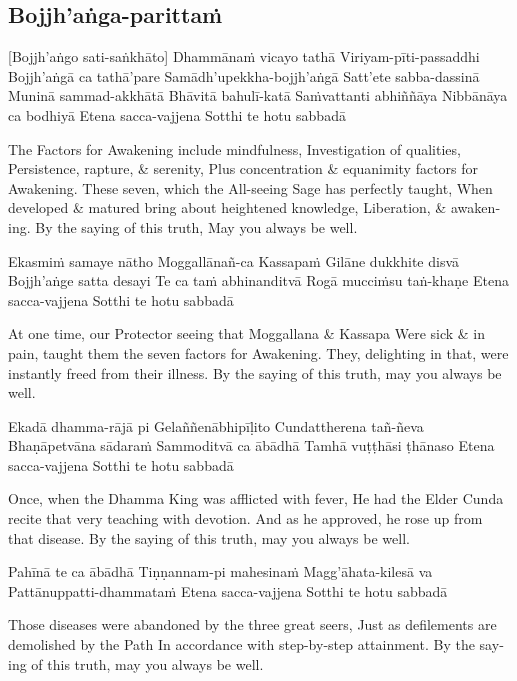 \subsection{Bojjh’aṅga-parittaṁ}
[Bojjh’aṅgo sati-saṅkhāto]
Dhammānaṁ vicayo tathā
Viriyam-pīti-passaddhi
Bojjh’aṅgā ca tathā’pare
Samādh’upekkha-bojjh’aṅgā
Satt’ete sabba-dassinā
Muninā sammad-akkhātā
Bhāvitā bahulī-katā
Saṁvattanti abhiññāya
Nibbānāya ca bodhiyā
Etena sacca-vajjena
Sotthi te hotu sabbadā

\begin{english}
  The Factors for Awakening include mindfulness,
  Investigation of qualities,
  Persistence, rapture, \& serenity,
  Plus concentration \& equanimity factors for Awakening.
  These seven, which the All-seeing Sage has perfectly taught,
  When developed \& matured bring about heightened knowledge, Liberation, \& awakening.
  By the saying of this truth,
  May you always be well.
\end{english}

Ekasmiṁ samaye nātho
Moggallānañ-ca Kassapaṁ
Gilāne dukkhite disvā
Bojjh’aṅge satta desayi
Te ca taṁ abhinanditvā
Rogā mucciṁsu taṅ-khaṇe
Etena sacca-vajjena
Sotthi te hotu sabbadā

\begin{english}
  At one time, our Protector seeing that Moggallana \& Kassapa
  Were sick \& in pain, taught them the seven factors for Awakening.
  They, delighting in that, were instantly freed from their illness.
  By the saying of this truth, may you always be well.
\end{english}

Ekadā dhamma-rājā pi
Gelaññenābhipīḷito
Cundattherena tañ-ñeva
Bhaṇāpetvāna sādaraṁ
Sammoditvā ca ābādhā
Tamhā vuṭṭhāsi ṭhānaso
Etena sacca-vajjena
Sotthi te hotu sabbadā

\begin{english}
  Once, when the Dhamma King was afflicted with fever,
  He had the Elder Cunda recite that very teaching with devotion.
  And as he approved, he rose up from that disease.
  By the saying of this truth, may you always be well.
\end{english}

Pahīnā te ca ābādhā
Tiṇṇannam-pi mahesinaṁ
Magg’āhata-kilesā va
Pattānuppatti-dhammataṁ
Etena sacca-vajjena
Sotthi te hotu sabbadā

\begin{english}
  Those diseases were abandoned by the three great seers,
  Just as defilements are demolished by the Path
  In accordance with step-by-step attainment.
  By the saying of this truth, may you always be well.
\end{english}

